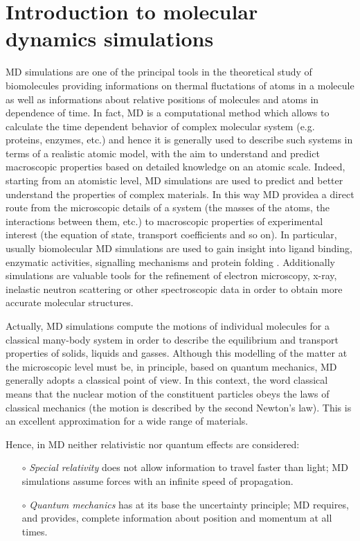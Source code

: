 \section{Introduction to molecular dynamics simulations}
MD simulations are one of the principal tools in the theoretical study of biomolecules providing informations on thermal fluctations of atoms in a molecule as well as informations about relative positions of molecules and atoms in dependence of time. In fact, MD is a computational method which allows to calculate the time dependent behavior of complex molecular system (e.g. proteins, enzymes, etc.) and hence it is generally used to describe such systems in terms of a realistic atomic model, with the aim to understand and predict macroscopic properties based on detailed knowledge on an atomic scale. Indeed, starting from an atomistic level, MD simulations are used to predict and better understand the properties of complex materials. In this way MD providea a direct route from the microscopic details of a system (the masses of the atoms, the interactions between them, etc.) to macroscopic properties of experimental interest (the equation of state, transport coefficients and so on). In particular, usually biomolecular MD simulations are used to gain insight into ligand binding, enzymatic activities, signalling mechanisms and protein folding \cite{ref:NAMD-VMD_Kukol}. Additionally simulations are valuable tools for the refinement of electron microscopy, x-ray, inelastic neutron scattering or other spectroscopic data in order to obtain more accurate molecular structures.

Actually, MD simulations compute the motions of individual molecules for a classical many-body system in order to describe the equilibrium and transport properties of solids, liquids and gasses.
Although this modelling of the matter at the microscopic level must be, in principle, based on quantum mechanics, MD generally adopts a classical point of view.
In this context, the word classical means that the nuclear motion of the constituent particles obeys the laws of classical mechanics (the motion is described by the second Newton's law).
This is an excellent approximation for a wide range of materials.

Hence, in MD neither relativistic nor quantum effects are considered:
\begin{itemize}
\item[$\circ$] \textit{Special relativity} does not allow information to travel faster than light; MD simulations assume forces with an infinite speed of propagation.
\item[$\circ$] \textit{Quantum mechanics} has at its base the uncertainty principle; MD requires, and provides, complete information about position and momentum at all times.
\end{itemize}

